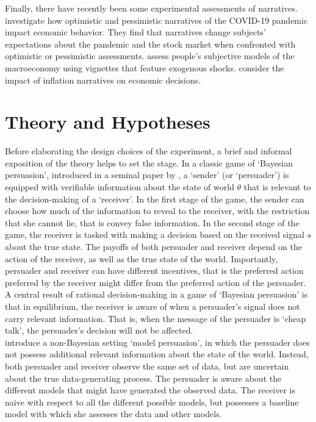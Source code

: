 \documentclass[11pt, a4paper, leqno]{article}
\begin{document}
Finally, there have recently been some experimental assessments of narratives. \citet{Harrs} investigate how optimistic and pessimistic narratives of the COVID-19 pandemic impact economic behavior. They find that narratives change subjects’ expectations about the pandemic and the stock market when confronted with optimistic or pessimistic assessments. \citet{Andre} assess people's subjective models of the macroeconomy using vignettes that feature exogenous shocks. \cite{haaland2021inflation} consider the impact of inflation narratives on economic decisions.

\section{Theory and Hypotheses}

Before elaborating the design choices of the experiment, a brief and informal exposition of the theory helps to set the stage. In a classic game of `Bayesian persuasion', introduced in a seminal paper by \cite{KG}, a `sender' (or `persuader') is equipped with verifiable information about the state of world $\theta$ that is relevant to the decision-making of a `receiver'. In the first stage of the game, the sender can choose how much of the information to reveal to the receiver, with the restriction that she cannot lie, that is convey false information. In the second stage of the game, the receiver is tasked with making a decision based on the received signal $s$ about the true state. The payoffs of both persuader and receiver depend on the action of the receiver, as well as the true state of the world. Importantly, persuader and receiver can have different incentives, that is the preferred action preferred by the receiver might differ from the preferred action of the persuader.\\

A central result of rational decision-making in a game of `Bayesian persuasion' is that in equilibrium, the receiver is aware of when a persuader's signal does not carry relevant information. That is, when the message of the persuader is `cheap talk', the persuader's decision will not be affected.\\

\cite{Schwartzstein} introduce a non-Bayesian setting `model persuasion', in which the persuader does not possess additional relevant information about the state of the world. Instead, both persuader and receiver observe the same set of data, but are uncertain about the true data-generating process. The persuader is aware about the different models that might have generated the observed data. The receiver is naive with respect to all the different possible models, but possesses a baseline model with which she assesses the data and other models.
\end{document}
